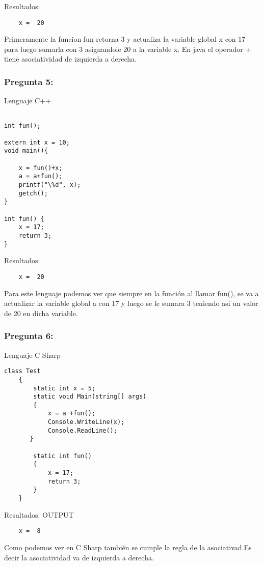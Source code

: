 \documentclass[11pt]{article}
\begin{document}
\noindent Resultados:
\begin{verbatim}
	x =  20
\end{verbatim}

Primeramente la funcion fun retorna 3 y actualiza la variable global x con 17 para luego sumarla con 3 asignandole 20 a la variable x.
En java el operador + tiene asociatividad de izquierda a derecha.

\subsubsection{Pregunta 5:}

Lenguaje C++

\begin{lstlisting}[frame=single] 

int fun();

extern int x = 10;
void main(){
	
	x = fun()+x;
	a = a+fun();
	printf("\%d", x);
	getch();
}

int fun() {
	x = 17;
	return 3;
}
\end{lstlisting}

\noindent Resultados:
\begin{verbatim}
	x =  20
\end{verbatim}

Para este lenguaje podemos ver que siempre en la función al llamar fun(), se va a actualizar la variable global a con 17 y luego se le sumara 3 teniendo asi un valor de 20 en dicha variable.


\subsubsection{Pregunta 6:}
Lenguaje C Sharp

\begin{lstlisting}[frame=single]
class Test
    {
        static int x = 5;
        static void Main(string[] args)
        {
            x = a +fun();
            Console.WriteLine(x);
            Console.ReadLine();
       }

        static int fun()
        {
            x = 17;
            return 3;
        }
    }
\end{lstlisting}

\noindent Resultados:
OUTPUT\\
\begin{verbatim}
	x =  8
\end{verbatim}

Como podemos ver en C Sharp también se cumple la regla de la asociativad.Es decir la asociatividad va de izquierda a derecha.
\end{document}
